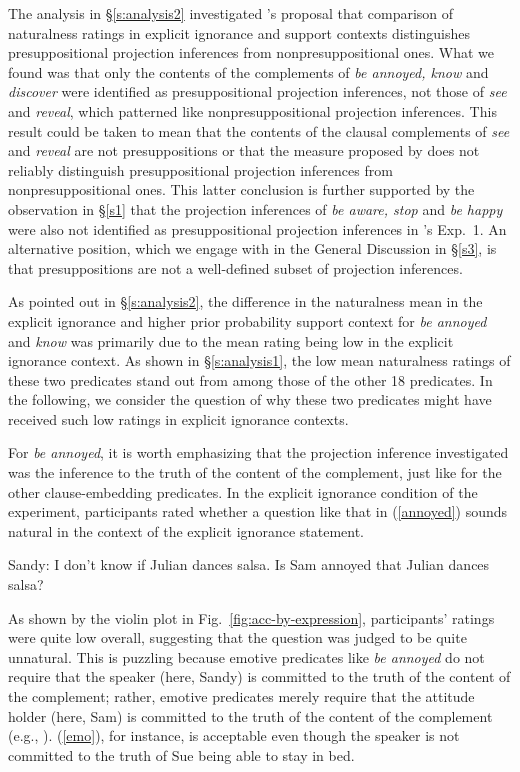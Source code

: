 \documentclass[11pt,fleqn]{article}
\newcommand{\6}{\mbox{$[\hspace*{-.6mm}[$}}
\newcommand{\9}{\mbox{$]\hspace*{-.6mm}]$}}
\newcommand{\citepos}[1]{\citeauthor{#1}'s \citeyear{#1}}
\begin{document}
The analysis in \S\ref{s:analysis2} investigated \citepos{mandelkern-etal2020} proposal that comparison of naturalness ratings in explicit ignorance and support contexts distinguishes presuppositional projection inferences from nonpresuppositional ones. What we found was that only the contents of the complements of \emph{be annoyed, know} and \emph{discover} were identified as presuppositional projection inferences, not those of \emph{see} and \emph{reveal}, which patterned like nonpresuppositional projection inferences. This result could be taken to mean that the contents of the clausal complements of \emph{see} and \emph{reveal} are not presuppositions or that the measure proposed by \citealt{mandelkern-etal2020} does not reliably distinguish presuppositional projection inferences from nonpresuppositional ones. This latter conclusion is further supported by the observation in \S\ref{s1} that  the projection inferences of \emph{be aware, stop} and \emph{be happy} were also not identified as presuppositional projection inferences in \citepos{kalomoiros-schwarz2024} Exp.~1. An alternative position, which we engage with in the General Discussion in \S\ref{s3}, is that presuppositions are not a well-defined subset of projection inferences.

As pointed out in \S\ref{s:analysis2}, the difference in the naturalness mean in the explicit ignorance and higher prior probability support context for \emph{be annoyed} and \emph{know} was primarily due to the mean rating being low in the explicit ignorance context. As shown in \S\ref{s:analysis1}, the low mean naturalness ratings of these two predicates stand out from among those of the other 18 predicates. In the following, we consider the question of why these two predicates might have received such low ratings in explicit ignorance contexts. 

For \emph{be annoyed}, it is worth emphasizing that the projection inference investigated was the inference to the truth of the content of the complement, just like for the other clause-embedding predicates. In the explicit ignorance condition of the experiment, participants rated whether a question like that in (\ref{annoyed}) sounds natural in the context of the explicit ignorance statement. 

\begin{exe}
\ex\label{annoyed} Sandy: I don't know if Julian dances salsa. Is Sam annoyed that Julian dances salsa?
\end{exe}
As shown by the violin plot in Fig.~\ref{fig:acc-by-expression}, participants' ratings were quite low overall, suggesting that the question was judged to be quite unnatural. This is puzzling because emotive predicates like \emph{be annoyed} do not require that the speaker (here, Sandy) is committed to the truth of the content of the complement; rather, emotive predicates merely require that the attitude holder (here, Sam) is committed to the truth of the content of the complement (e.g., \citealt{heim92,karttunen2016,djaerv-thesis}). (\ref{emo}), for instance, is acceptable even though the speaker is not committed to the truth of Sue being able to stay in bed. 
\end{document}
